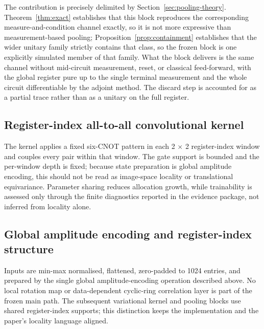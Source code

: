 \documentclass[conference]{IEEEtran}
\begin{document}
The contribution is precisely delimited by Section~\ref{sec:pooling-theory}. Theorem~\ref{thm:exact} establishes that this block reproduces the corresponding measure-and-condition channel exactly, so it is not more expressive than measurement-based pooling; Proposition~\ref{prop:containment} establishes that the wider unitary family strictly contains that class, so the frozen block is one explicitly simulated member of that family. What the block delivers is the same channel without mid-circuit measurement, reset, or classical feed-forward, with the global register pure up to the single terminal measurement and the whole circuit differentiable by the adjoint method. The discard step is accounted for as a partial trace rather than as a unitary on the full register.

\subsection{Register-index all-to-all convolutional kernel}
The kernel applies a fixed six-CNOT pattern in each 2 $\times$ 2 register-index window and couples every pair within that window. The gate support is bounded and the per-window depth is fixed; because state preparation is global amplitude encoding, this should not be read as image-space locality or translational equivariance. Parameter sharing reduces allocation growth, while trainability is assessed only through the finite diagnostics reported in the evidence package, not inferred from locality alone.

\subsection{Global amplitude encoding and register-index structure}
Inputs are min-max normalised, flattened, zero-padded to 1024 entries, and prepared by the single global amplitude-encoding operation described above. No local rotation map or data-dependent cyclic-ring correlation layer is part of the frozen main path. The subsequent variational kernel and pooling blocks use shared register-index supports; this distinction keeps the implementation and the paper's locality language aligned.
\end{document}
